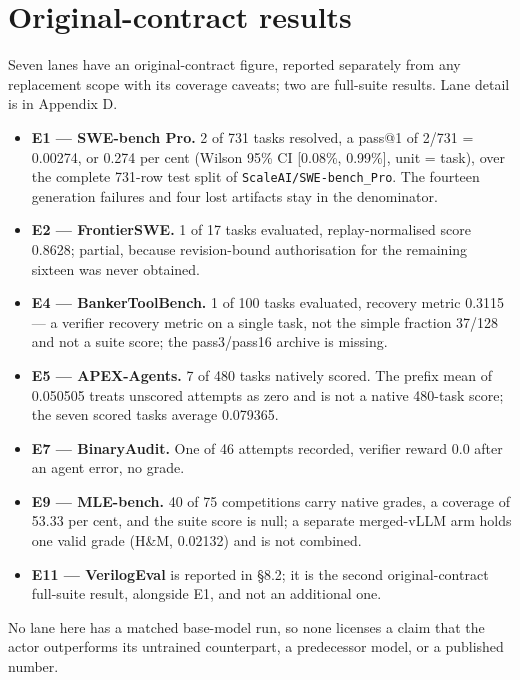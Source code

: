 \documentclass[12pt,a4paper]{report}
\providecommand{\tightlist}{%
  \setlength{\itemsep}{0pt}\setlength{\parskip}{0pt}}
\begin{document}
\section{Original-contract results}\label{original-contract-results}

Seven lanes have an original-contract figure, reported separately from
any replacement scope with its coverage caveats; two are full-suite
results. Lane detail is in Appendix D.

\begin{itemize}
\tightlist
\item
  \textbf{E1 --- SWE-bench Pro.} 2 of 731 tasks resolved, a pass@1 of
  2/731 = 0.00274, or 0.274 per cent (Wilson 95\% CI {[}0.08\%,
  0.99\%{]}, unit = task), over the complete 731-row test split of
  \texttt{ScaleAI/SWE-bench\_Pro}. The fourteen generation failures and
  four lost artifacts stay in the denominator.
\item
  \textbf{E2 --- FrontierSWE.} 1 of 17 tasks evaluated,
  replay-normalised score 0.8628; partial, because revision-bound
  authorisation for the remaining sixteen was never obtained.
\item
  \textbf{E4 --- BankerToolBench.} 1 of 100 tasks evaluated, recovery
  metric 0.3115 --- a verifier recovery metric on a single task, not the
  simple fraction 37/128 and not a suite score; the pass3/pass16 archive
  is missing.
\item
  \textbf{E5 --- APEX-Agents.} 7 of 480 tasks natively scored. The
  prefix mean of 0.050505 treats unscored attempts as zero and is not a
  native 480-task score; the seven scored tasks average 0.079365.
\item
  \textbf{E7 --- BinaryAudit.} One of 46 attempts recorded, verifier
  reward 0.0 after an agent error, no grade.
\item
  \textbf{E9 --- MLE-bench.} 40 of 75 competitions carry native grades,
  a coverage of 53.33 per cent, and the suite score is null; a separate
  merged-vLLM arm holds one valid grade (H\&M, 0.02132) and is not
  combined.
\item
  \textbf{E11 --- VerilogEval} is reported in §8.2; it is the second
  original-contract full-suite result, alongside E1, and not an
  additional one.
\end{itemize}

No lane here has a matched base-model run, so none licenses a claim that
the actor outperforms its untrained counterpart, a predecessor model, or
a published number.
\end{document}
